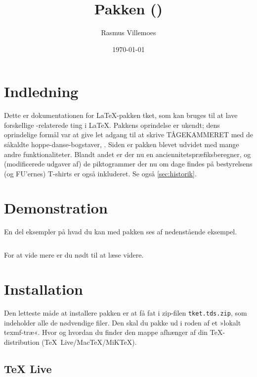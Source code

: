 \documentclass[a4paper,article,oneside,danish]{memoir}
\title{Pakken \ptket (\pTKETVer)}
\author{Rasmus Villemoes}
\date{\today}
\newcommand{\pakkenavn}[1]{\textsf{#1}}
\newcommand{\ptket}{\pakkenavn{tket}\xspace}
\newcommand{\filnavn}[1]{\texttt{#1}}
\newenvironment{resultat}{%
  \begin{adjustwidth}{15mm}{15mm}%
    \begin{qshade}%
    }{%
    \end{qshade}%
  \end{adjustwidth}}
\begin{document}
\maketitle

\tableofcontents*

\chapter{Indledning}
\label{cha:indledning}

Dette er dokumentationen for \LaTeX-pakken \ptket, som kan bruges til
at lave forskellige \TK-relaterede ting i \LaTeX. Pakkens oprindelse
er ukendt; dens oprindelige formål var at give let adgang til at
skrive \hbox{TÅGEKAMMERET} med de såkaldte hoppe-danse-bogstaver,
\TKET. Siden er pakken blevet udvidet med mange andre
funktionaliteter. Blandt andet er der nu en
anciennitetspræfiksberegner, og (modificerede udgaver af) de
piktogrammer der nu om dage findes på bestyrelsens (og FU'ernes)
T-shirts er også inkluderet. Se også \vref{sec:historik}.

\chapter{Demonstration}
\label{cha:demonstration}

En del eksempler på hvad du kan med pakken ses af nedenstående
eksempel.
\inputminted{latex}{eksempel-demo.tex}

\begin{resultat}

\end{resultat}

For at vide mere er du nødt til at læse videre.

\chapter{Installation}
\label{cha:installation}

Den letteste måde at installere pakken er at få fat i zip-filen
\filnavn{tket.tds.zip}, som indeholder alle de nødvendige filer. Den
skal du pakke ud i roden af et »lokalt texmf-træ«. Hvor og hvordan du
finder den mappe afhænger af din \TeX-distribution (\mbox{\TeX{}
  Live}/\mbox{Mac\TeX}/\mbox{MiK\TeX}).

\section{\TeX{} Live}
\label{sec:tex-live}
\end{document}
